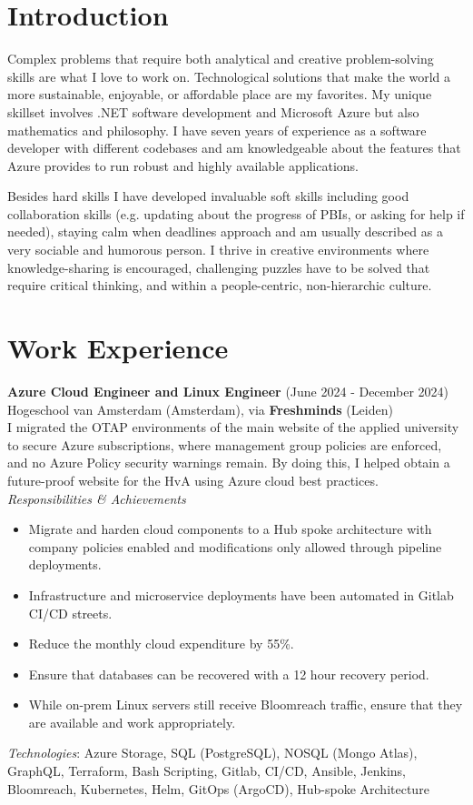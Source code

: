 \documentclass[a4paper,8pt]{article}
\begin{document}
\section{Introduction}
Complex problems that require both analytical and creative problem-solving skills are what I love to work on.
Technological solutions that make the world a more sustainable, enjoyable, or affordable place are my favorites. My unique skillset involves .NET software development and Microsoft Azure but also mathematics and philosophy. I have seven years of experience as a software developer with different codebases and am knowledgeable about the features that Azure provides to run robust and highly available applications. 

\noindent
Besides hard skills I have developed invaluable soft skills including good collaboration skills (e.g. updating about the progress of PBIs, or asking for help if needed), staying calm when deadlines approach and am usually described as a very sociable and humorous person. I thrive in creative environments where knowledge-sharing is encouraged, challenging puzzles have to be solved that require critical thinking, and within a people-centric, non-hierarchic culture.

\section{Work Experience}
\textbf{Azure Cloud Engineer and Linux Engineer} (June 2024 - December 2024) \\
Hogeschool van Amsterdam (Amsterdam), via \textbf{Freshminds} (Leiden) \\
I migrated the OTAP environments of the main website of the applied university to secure Azure subscriptions, 
 where management group policies are enforced, and no Azure Policy security warnings remain.
 By doing this, I helped obtain a future-proof website for the HvA using Azure cloud best practices.\\
\textit{Responsibilities \& Achievements}
\begin{itemize}
\item Migrate and harden cloud components to a Hub spoke architecture with company policies enabled and modifications only allowed through pipeline deployments.
\item Infrastructure and microservice deployments have been automated in Gitlab CI/CD streets.
\item Reduce the monthly cloud expenditure by 55\%.
\item Ensure that databases can be recovered with a 12 hour recovery period.
\item While on-prem Linux servers still receive Bloomreach traffic, ensure that they are available and work appropriately.
\end{itemize}
\textit{Technologies}: Azure Storage, SQL (PostgreSQL), NOSQL (Mongo Atlas),  GraphQL, Terraform, Bash Scripting, Gitlab, CI/CD, Ansible, Jenkins, Bloomreach,
Kubernetes, Helm, GitOps (ArgoCD), Hub-spoke Architecture
\end{document}
